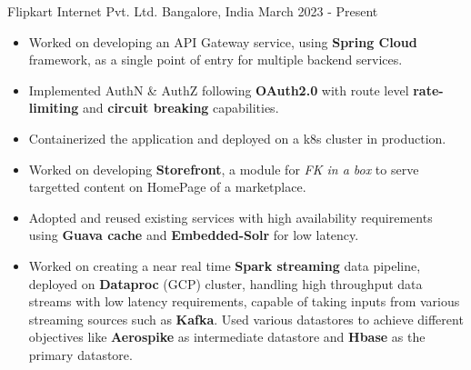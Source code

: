 \documentclass[a4paper]{MagicalCV}
\begin{document}
\lastupdated


 
\begin{minipage}[t]{0.5\textwidth} 



\begin{cventries}
  \cventry
    {} %
    {Flipkart Internet Pvt. Ltd.} %
    {Bangalore, India} %
    {March 2023 - Present} %
    {
        \vspace*{-\baselineskip}
        \item \hspace{2pt} 
        \begin{itemize}[leftmargin=6mm]
            \item {Worked on developing an API Gateway service, using \textbf{Spring Cloud} framework, as a single point of entry for multiple backend services.}
            \item {Implemented AuthN \& AuthZ following \textbf{OAuth2.0} with route level \textbf{rate-limiting} and \textbf{circuit breaking} capabilities.}
            \item {Containerized the application and deployed on a k8s cluster in production.}
        \end{itemize}
        \vspace{4pt}
        \item \hspace{2pt} 
        \begin{itemize}[leftmargin=6mm]
            \item {Worked on developing \textbf{Storefront}, a module for \textit{FK in a box} to serve targetted content on HomePage of a marketplace.}
            \item {Adopted and reused existing services with high availability requirements using \textbf{Guava cache} and \textbf{Embedded-Solr} for low latency.}
            \item {Worked on creating a near real time \textbf{Spark streaming} data pipeline, deployed on \textbf{Dataproc} (GCP) cluster, handling high throughput data streams with low latency requirements, capable of taking inputs from various streaming sources such as \textbf{Kafka}. Used various datastores to achieve different objectives like \textbf{Aerospike} as intermediate datastore and \textbf{Hbase} as the primary datastore.}

\end{itemize}}
\end{cventries}
\end{minipage}
\end{document}
